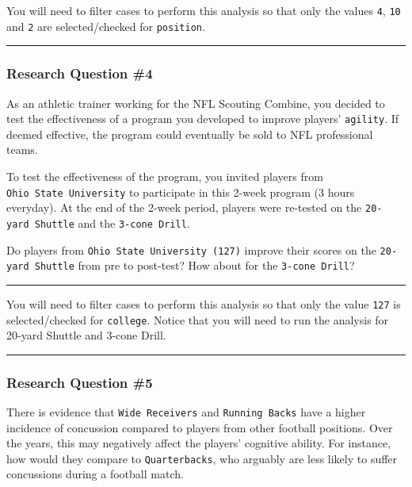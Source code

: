 \documentclass[
]{article}
\begin{document}
You will need to filter cases to perform this analysis so that only the values \texttt{4}, \texttt{10} and \texttt{2} are selected/checked for \texttt{position}.

\begin{center}\rule{0.5\linewidth}{0.5pt}\end{center}

\hypertarget{research-question-4}{%
\subsubsection{Research Question \#4}\label{research-question-4}}

As an athletic trainer working for the NFL Scouting Combine, you decided to test the effectiveness of a program you developed to improve players' \texttt{agility}. If deemed effective, the program could eventually be sold to NFL professional teams.

To test the effectiveness of the program, you invited players from \texttt{Ohio\ State\ University} to participate in this 2-week program (3 hours everyday). At the end of the 2-week period, players were re-tested on the \texttt{20-yard\ Shuttle} and the \texttt{3-cone\ Drill}.

Do players from \texttt{Ohio\ State\ University\ (127)} improve their scores on the \texttt{20-yard\ Shuttle} from pre to post-test? How about for the \texttt{3-cone\ Drill}?

\begin{center}\rule{0.5\linewidth}{0.5pt}\end{center}

You will need to filter cases to perform this analysis so that only the value \texttt{127} is selected/checked for \texttt{college}. Notice that you will need to run the analysis for 20-yard Shuttle and 3-cone Drill.

\begin{center}\rule{0.5\linewidth}{0.5pt}\end{center}

\hypertarget{research-question-5}{%
\subsubsection{Research Question \#5}\label{research-question-5}}

There is evidence that \texttt{Wide\ Receivers} and \texttt{Running\ Backs} have a higher incidence of concussion compared to players from other football positions. Over the years, this may negatively affect the players' cognitive ability. For instance, how would they compare to \texttt{Quarterbacks}, who arguably are less likely to suffer concussions during a football match.
\end{document}
